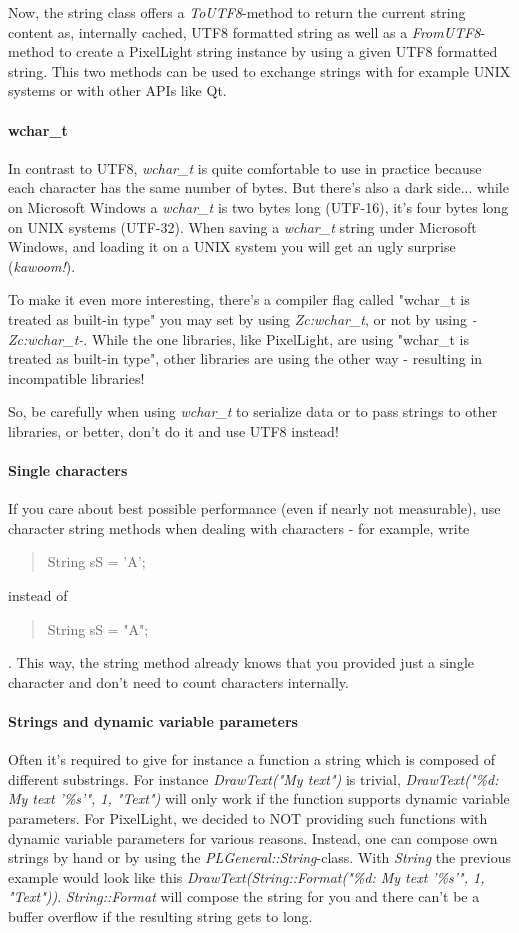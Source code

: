 Now, the string class offers a \emph{ToUTF8}-method to return the current string content as, internally cached, UTF8 formatted string as well as a \emph{FromUTF8}-method to create a PixelLight string instance by using a given UTF8 formatted string. This two methods can be used to exchange strings with for example UNIX systems or with other APIs like Qt.


\paragraph{wchar\_t}
In contrast to UTF8, \emph{wchar\_t} is quite comfortable to use in practice because each character has the same number of bytes. But there's also a dark side... while on Microsoft Windows a \emph{wchar\_t} is two bytes long (UTF-16), it's four bytes long on UNIX systems (UTF-32). When saving a \emph{wchar\_t} string under Microsoft Windows, and loading it on a UNIX system you will get an ugly surprise (\emph{kawoom!}).

To make it even more interesting, there's a compiler flag called "wchar\_t is treated as built-in type" you may set by using \emph{Zc:wchar\_t}, or not by using \emph{-Zc:wchar\_t-}. While the one libraries, like PixelLight, are using "wchar\_t is treated as built-in type", other libraries are using the other way - resulting in incompatible libraries!

So, be carefully when using \emph{wchar\_t} to serialize data or to pass strings to other libraries, or better, don't do it and use UTF8 instead!


\paragraph{Single characters}
If you care about best possible performance (even if nearly not measurable), use character string methods when dealing with characters - for example, write \begin{quote}String sS = 'A';\end{quote} instead of \begin{quote}String sS = "A";\end{quote}. This way, the string method already knows that you provided just a single character and don't need to count characters internally.


\paragraph{Strings and dynamic variable parameters}
Often it's required to give for instance a function a string which is composed of different substrings. For instance \emph{DrawText("My text")} is trivial, \emph{DrawText("\%d: My text '\%s'", 1, "Text")} will only work if the function supports dynamic variable parameters. For PixelLight, we decided to NOT providing such functions with dynamic variable parameters for various reasons. Instead, one can compose own strings by hand or by using the \emph{PLGeneral::String}-class. With \emph{String} the previous example would look like this \emph{DrawText(String::Format("\%d: My text '\%s'", 1, "Text"))}. \emph{String::Format} will compose the string for you and there can't be a buffer overflow if the resulting string gets to long.

